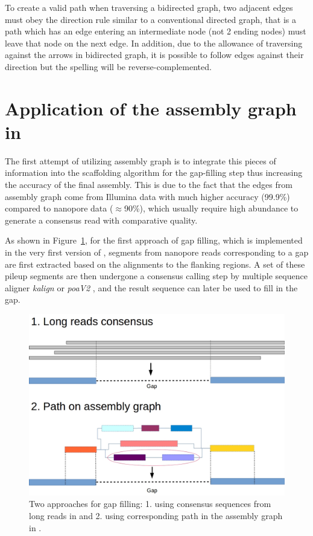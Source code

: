 To create a valid path when traversing a bidirected graph, two adjacent edges must obey the direction rule similar to a conventional directed graph, that is a path which has an edge entering an intermediate node (not 2 ending nodes) must leave that node on the next edge. In addition, due to the allowance of traversing against the arrows in bidirected graph, it is possible to follow edges against their direction but the spelling will be reverse-complemented.

\section{Application of the assembly graph in \npscarfg{}}
The first attempt of utilizing assembly graph is to integrate this pieces of information into the scaffolding algorithm for the gap-filling step thus increasing the accuracy of the final assembly. This is due to the fact that the edges from assembly graph come from Illumina data with much higher accuracy (99.9\%) compared to nanopore data ($\approx$90\%), which usually require high abundance to generate a consensus read with comparative quality. 

As shown in Figure~\ref{f:gapfilling}, for the first approach of gap filling, which is implemented in the very first version of \npscarf{}, segments from nanopore reads corresponding to a gap are first extracted based on the alignments to the flanking regions. A set of these pileup segments are then undergone a consensus calling step by multiple sequence aligner \EG{} \emph{kalign} \cite{LassmannFS2009} or \emph{poaV2} \cite{Lee2002multiple,Lee2003generating,Grasso2004combining}, and the result sequence can later be used to fill in the gap. 

\begin{figure}[!ht]
\centering
\includegraphics[width=.7\linewidth]{images/gapfilling.jpg}
\caption[Two approaches for gap filling in our methods.]
{Two approaches for gap filling: 1. using consensus sequences from long reads in \npscarf{}  and 2. using corresponding path in the assembly graph in \npscarfg{} .}
\label{f:gapfilling}
\end{figure}

